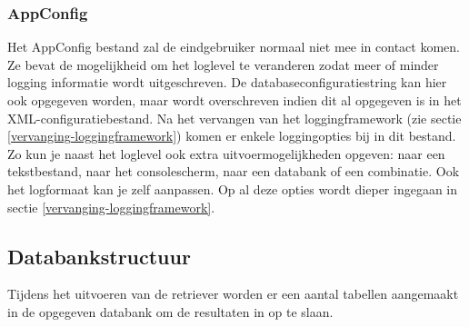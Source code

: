 \subsubsection{AppConfig}
Het AppConfig bestand zal de eindgebruiker normaal niet mee in contact komen.
Ze bevat de mogelijkheid om het loglevel te veranderen zodat meer of minder logging informatie wordt uitgeschreven.
De databaseconfiguratiestring kan hier ook opgegeven worden, maar wordt overschreven indien dit al opgegeven is in het XML-configuratiebestand.
Na het vervangen van het loggingframework (zie sectie \ref{vervanging-loggingframework}) komen er enkele loggingopties bij in dit bestand.
Zo kun je naast het loglevel ook extra uitvoermogelijkheden opgeven: naar een tekstbestand, naar het consolescherm, naar een databank of een combinatie.
Ook het logformaat kan je zelf aanpassen. Op al deze opties wordt dieper ingegaan in sectie \ref{vervanging-loggingframework}.


\subsection{Databankstructuur}
Tijdens het uitvoeren van de retriever worden er een aantal tabellen aangemaakt in de opgegeven databank om de resultaten in op te slaan.


